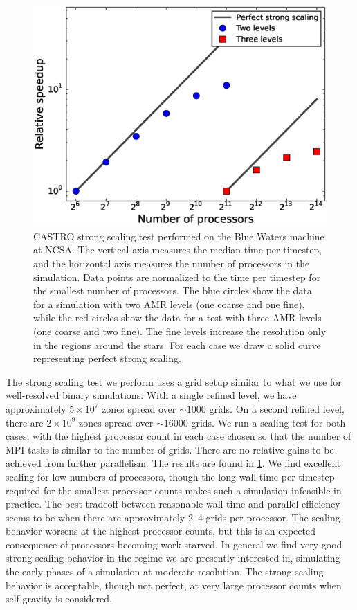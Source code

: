\documentclass[iop]{emulateapj}
\begin{document}
\begin{figure}
  \centering
  \includegraphics[scale=0.4]{plots/strong_scaling}
  \caption{CASTRO strong scaling test performed on the Blue Waters machine at
    NCSA. The vertical axis measures the median time per timestep, and the 
    horizontal axis measures the number of processors in the simulation. Data 
    points are normalized to the time per timestep for the smallest number 
    of processors. The blue circles show the data for a simulation with two AMR
    levels (one coarse and one fine), while the red circles show the data 
    for a test with three AMR levels (one coarse and two fine). The fine levels 
    increase the resolution only in the regions around the stars. For each case 
    we draw a solid curve representing perfect strong scaling.\label{fig:strong_scaling}}
\end{figure}

The strong scaling test we perform uses a grid setup similar to what we 
use for well-resolved binary simulations. With a single refined level, 
we have approximately $5 \times 10^7$ zones spread over $\sim 1000$ grids.
On a second refined level, there are $2 \times 10^9$ zones spread over 
$\sim 16000$ grids. We run a scaling test for both cases, with the 
highest processor count in each case chosen so that the number of 
MPI tasks is similar to the number of grids. There are no relative gains 
to be achieved from further parallelism. The results are found in 
\ref{fig:strong_scaling}. We find excellent scaling for low numbers 
of processors, though the long wall time per timestep required for the 
smallest processor counts makes such a simulation infeasible in practice.
The best tradeoff between reasonable wall time and parallel efficiency 
seems to be when there are approximately 2--4 grids per processor. The 
scaling behavior worsens at the highest processor counts, but this is 
an expected consequence of processors becoming work-starved. In general 
we find very good strong scaling behavior in the regime we are presently 
interested in, simulating the early phases of a simulation at moderate 
resolution. The strong scaling behavior is acceptable, though not perfect, 
at very large processor counts when self-gravity is considered.
\end{document}
